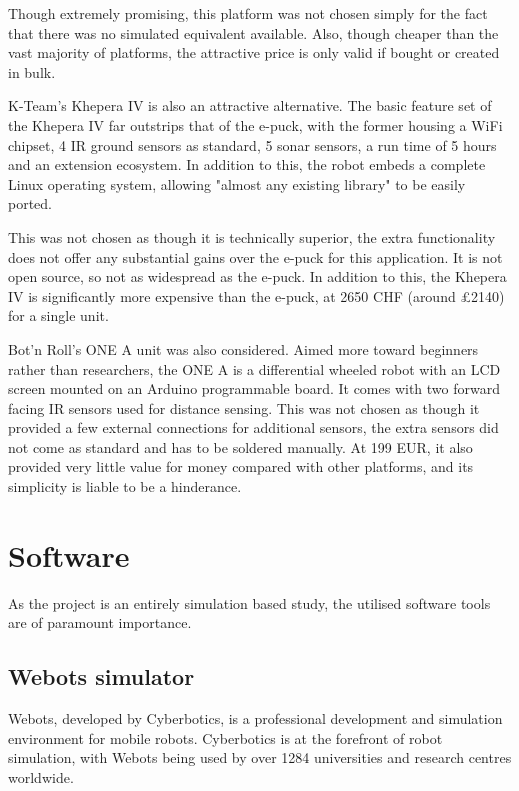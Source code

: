 Though extremely promising, this platform was not chosen simply for the fact that there was no simulated equivalent available. Also, though cheaper than the vast majority of platforms, the attractive price is only valid if bought or created in bulk.

K-Team's Khepera IV is also an attractive alternative. The basic feature set of the Khepera IV far outstrips that of the e-puck, with the former housing a WiFi chipset, 4 IR ground sensors as standard, 5 sonar sensors, a run time of 5 hours and an extension ecosystem. In addition to this, the robot embeds a complete Linux operating system, allowing "almost any existing library" to be easily ported. \cite{khepera}

This was not chosen as though it is technically superior, the extra functionality does not offer any substantial gains over the e-puck for this application. It is not open source, so not as widespread as the e-puck. In addition to this, the Khepera IV is significantly more expensive than the e-puck, at 2650 CHF (around \pounds2140) for a single unit.

Bot'n Roll's ONE A unit was also considered. Aimed more toward beginners rather than researchers, the ONE A is a differential wheeled robot with an LCD screen mounted on an Arduino programmable board. It comes with two forward facing IR sensors used for distance sensing. \cite{onea} This was not chosen as though it provided a few external connections for additional sensors, the extra sensors did not come as standard and has to be soldered manually. At 199 EUR, it also provided very little value for money compared with other platforms, and its simplicity is liable to be a hinderance.
\clearpage

\section{Software}

As the project is an entirely simulation based study, the utilised software tools are of paramount importance. 

\subsection{Webots simulator}
\label{webots}

Webots, developed by Cyberbotics, is a professional development and simulation environment for mobile robots. Cyberbotics is at the forefront of robot simulation, with Webots being used by over 1284 universities and research centres worldwide. \cite{cyberbotics-about}

